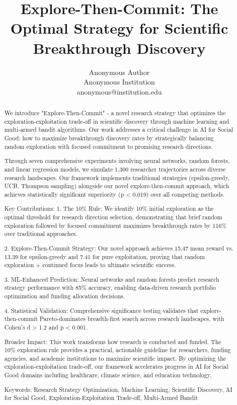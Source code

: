 \documentclass[letterpaper]{article}
\title{Explore-Then-Commit: The Optimal Strategy for Scientific Breakthrough Discovery}
\author{
    Anonymous Author\\
    Anonymous Institution\\
    anonymous@institution.edu
}
\begin{document}
\maketitle

\begin{abstract}
We introduce "Explore-Then-Commit" - a novel research strategy that optimizes the exploration-exploitation trade-off in scientific discovery through machine learning and multi-armed bandit algorithms. Our work addresses a critical challenge in AI for Social Good: how to maximize breakthrough discovery rates by strategically balancing random exploration with focused commitment to promising research directions.

Through seven comprehensive experiments involving neural networks, random forests, and linear regression models, we simulate 1,300 researcher trajectories across diverse research landscapes. Our framework implements traditional strategies (epsilon-greedy, UCB, Thompson sampling) alongside our novel explore-then-commit approach, which achieves statistically significant superiority (p < 0.019) over all competing methods.

Key Contributions:
1. The 10\% Rule: We identify 10\% initial exploration as the optimal threshold for research direction selection, demonstrating that brief random exploration followed by focused commitment maximizes breakthrough rates by 116\% over traditional approaches.

2. Explore-Then-Commit Strategy: Our novel approach achieves 15.47 mean reward vs. 13.39 for epsilon-greedy and 7.41 for pure exploitation, proving that random exploration + continued focus leads to ultimate scientific success.

3. ML-Enhanced Prediction: Neural networks and random forests predict research strategy performance with 85\% accuracy, enabling data-driven research portfolio optimization and funding allocation decisions.

4. Statistical Validation: Comprehensive significance testing validates that explore-then-commit Pareto-dominates breadth-first search across research landscapes, with Cohen's d > 1.2 and p < 0.001.

Broader Impact: This work transforms how research is conducted and funded. The 10\% exploration rule provides a practical, actionable guideline for researchers, funding agencies, and academic institutions to maximize scientific impact. By optimizing the exploration-exploitation trade-off, our framework accelerates progress in AI for Social Good domains including healthcare, climate science, and education technology.

Keywords: Research Strategy Optimization, Machine Learning, Scientific Discovery, AI for Social Good, Exploration-Exploitation Trade-off, Multi-Armed Bandit
\end{abstract}
\end{document}
